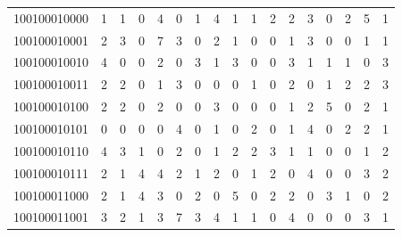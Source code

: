 \documentclass[10pt,a4paper]{article}
\begin{document}
\begin{longtable}{ |c|c|c|c|c|c|c|c|c|c|c|c|c|c|c|c|c| }
    100100010000              & 1                            & 1                                & 0                            & 4                              & 0   & 1   & 4   & 1   & 1   & 2   & 2   & 3   & 0   & 2   & 5   & 1   \\
    100100010001              & 2                            & 3                                & 0                            & 7                              & 3   & 0   & 2   & 1   & 0   & 0   & 1   & 3   & 0   & 0   & 1   & 1   \\
    100100010010              & 4                            & 0                                & 0                            & 2                              & 0   & 3   & 1   & 3   & 0   & 0   & 3   & 1   & 1   & 1   & 0   & 3   \\
    100100010011              & 2                            & 2                                & 0                            & 1                              & 3   & 0   & 0   & 0   & 1   & 0   & 2   & 0   & 1   & 2   & 2   & 3   \\
    100100010100              & 2                            & 2                                & 0                            & 2                              & 0   & 0   & 3   & 0   & 0   & 0   & 1   & 2   & 5   & 0   & 2   & 1   \\
    100100010101              & 0                            & 0                                & 0                            & 0                              & 4   & 0   & 1   & 0   & 2   & 0   & 1   & 4   & 0   & 2   & 2   & 1   \\
    100100010110              & 4                            & 3                                & 1                            & 0                              & 2   & 0   & 1   & 2   & 2   & 3   & 1   & 1   & 0   & 0   & 1   & 2   \\
    100100010111              & 2                            & 1                                & 4                            & 4                              & 2   & 1   & 2   & 0   & 1   & 2   & 0   & 4   & 0   & 0   & 3   & 2   \\
    100100011000              & 2                            & 1                                & 4                            & 3                              & 0   & 2   & 0   & 5   & 0   & 2   & 2   & 0   & 3   & 1   & 0   & 2   \\
    100100011001              & 3                            & 2                                & 1                            & 3                              & 7   & 3   & 4   & 1   & 1   & 0   & 4   & 0   & 0   & 0   & 3   & 1   \\

\end{longtable}
\end{document}
